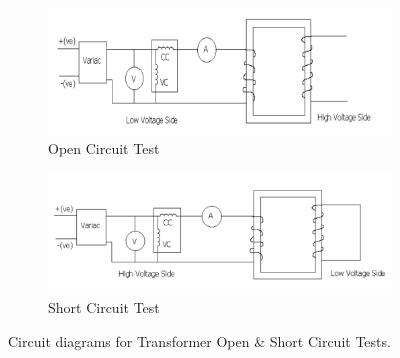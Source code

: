 \begin{figure}[H]
    \begin{subfigure}{\textwidth}
        \centering
        \includegraphics[width=\linewidth]{images/output/oct.png}
        \caption{Open Circuit Test}
        \label{fig:sfig1}
    \end{subfigure}
    \begin{subfigure}{\textwidth}
        \centering
        \includegraphics[width=\linewidth]{images/output/sct.png}
        \caption{Short Circuit Test}
        \label{fig:sfig2}
    \end{subfigure}
    \caption{Circuit diagrams for Transformer Open \& Short Circuit Tests.}
    \label{fig:fig}
\end{figure}